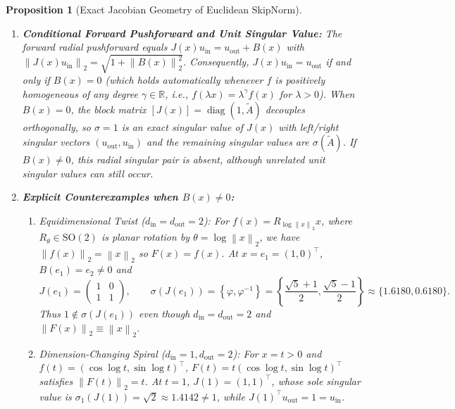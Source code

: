 \documentclass[10pt]{article}
\newtheorem{proposition}{Proposition}
\theoremstyle{definition}
\theoremstyle{remark}
\newcommand{\R}{\mathbb{R}}
\newcommand{\norm}[1]{\left\lVert #1 \right\rVert}
\DeclareMathOperator{\diag}{diag}
\begin{document}
\begin{proposition}[Exact Jacobian Geometry of Euclidean SkipNorm]
\begin{enumerate}
    \item[\textbf{(c)}] \textbf{Conditional Forward Pushforward and Unit Singular Value:} The forward radial pushforward equals $J(x) u_{\mathrm{in}} = u_{\mathrm{out}} + B(x)$ with $\norm{J(x) u_{\mathrm{in}}}_2 = \sqrt{1 + \norm{B(x)}_2^2}$. Consequently, $J(x) u_{\mathrm{in}} = u_{\mathrm{out}}$ if and only if $B(x) = 0$ (which holds automatically whenever $f$ is positively homogeneous of any degree $\gamma \in \R$, i.e., $f(\lambda x) = \lambda^\gamma f(x)$ for $\lambda > 0$). When $B(x) = 0$, the block matrix $[J(x)] = \diag(1, \tilde{A})$ decouples orthogonally, so $\sigma = 1$ is an exact singular value of $J(x)$ with left/right singular vectors $(u_{\mathrm{out}}, u_{\mathrm{in}})$ and the remaining singular values are $\sigma(\tilde{A})$. If $B(x)\ne0$, this radial singular pair is absent, although unrelated unit singular values can still occur.
    \item[\textbf{(d)}] \textbf{Explicit Counterexamples when $B(x) \neq 0$:}
    \begin{enumerate}
        \item[\emph{(i)}] \emph{Equidimensional Twist ($d_{\mathrm{in}} = d_{\mathrm{out}} = 2$):} For $f(x) = R_{\log \norm{x}_2} x$, where $R_\theta \in \mathrm{SO}(2)$ is planar rotation by $\theta = \log \norm{x}_2$, we have $\norm{f(x)}_2 = \norm{x}_2$ so $F(x) = f(x)$. At $x = e_1 = (1, 0)^\top$, $B(e_1) = e_2 \neq 0$ and
        \begin{equation*}
            J(e_1) = \begin{pmatrix} 1 & 0 \\ 1 & 1 \end{pmatrix}, \qquad \sigma(J(e_1)) = \left\{\varphi, \varphi^{-1}\right\} = \left\{\frac{\sqrt{5}+1}{2}, \frac{\sqrt{5}-1}{2}\right\} \approx \{1.6180, 0.6180\}.
        \end{equation*}
        Thus $1 \notin \sigma(J(e_1))$ even though $d_{\mathrm{in}} = d_{\mathrm{out}} = 2$ and $\norm{F(x)}_2 \equiv \norm{x}_2$.
        \item[\emph{(ii)}] \emph{Dimension-Changing Spiral ($d_{\mathrm{in}} = 1, d_{\mathrm{out}} = 2$):} For $x = t > 0$ and $f(t) = (\cos \log t, \sin \log t)^\top$, $F(t) = t (\cos \log t, \sin \log t)^\top$ satisfies $\norm{F(t)}_2 = t$. At $t = 1$, $J(1) = (1, 1)^\top$, whose sole singular value is $\sigma_1(J(1)) = \sqrt{2} \approx 1.4142 \neq 1$, while $J(1)^\top u_{\mathrm{out}} = 1 = u_{\mathrm{in}}$.
    \end{enumerate}
\end{enumerate}
\end{proposition}
\end{document}
